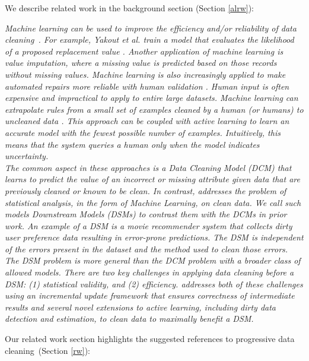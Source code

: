 We describe related work in the background section (Section \ref{alrw}):

\emph{Machine learning can be used to improve the efficiency and/or reliability of data cleaning~\cite{yakout2013don,gokhale2014corleone}.
For example, Yakout et al. train a model that evaluates the likelihood of a proposed replacement value \cite{yakout2013don}.
Another application of machine learning is value imputation, where a missing value is predicted based on those records without missing values.
Machine learning is also increasingly applied to make automated repairs more reliable with human validation \cite{DBLP:journals/pvldb/YakoutENOI11}.
Human input is often expensive and impractical to apply to entire large datasets.
Machine learning can extrapolate rules from a small set of examples cleaned by a human (or humans) to uncleaned data \cite{gokhale2014corleone, DBLP:journals/pvldb/YakoutENOI11}.
This approach can be coupled with active learning \cite{DBLP:journals/pvldb/MozafariSFJM14} to learn an accurate model with the fewest possible number of examples.
Intuitively, this means that the system queries a human only when the model indicates uncertainty.\\
The common aspect in these approaches is a Data Cleaning Model (DCM) that learns to predict the value of an incorrect or missing attribute given data that are previously cleaned or known to be clean.
In contrast, \sys addresses the problem of statistical analysis, in the form of Machine Learning, on clean data.
We call such models Downstream Models (DSMs) to contrast them with the DCMs in prior work.
An example of a DSM is a movie recommender system that collects dirty user preference data resulting in error-prone predictions.
The DSM is independent of the errors present in the dataset and the method used to clean those errors.
The DSM problem is more general than the DCM problem with a broader class of allowed models.
There are two key challenges in applying data cleaning before a DSM: (1) statistical validity, and (2) efficiency. 
\sys addresses both of these challenges using an incremental update framework that ensures correctness of intermediate results and several novel extensions to active learning, including dirty data detection and estimation, to clean data to maximally benefit a DSM.}

\vspace{0.5em}
Our related work section highlights the suggested references to progressive data cleaning~(Section \ref{rw}):

